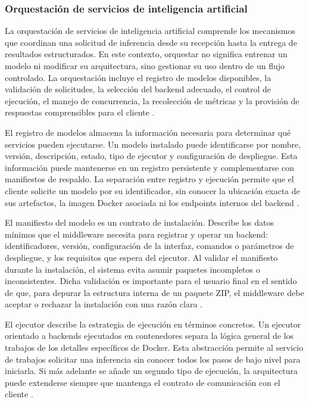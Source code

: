 \documentclass[11pt,a4paper]{article}
\begin{document}
\subsubsection{Orquestación de servicios de inteligencia artificial}

La orquestación de servicios de inteligencia artificial comprende los mecanismos que coordinan una solicitud de inferencia desde su recepción hasta la entrega de resultados estructurados. En este contexto, orquestar no significa entrenar un modelo ni modificar su arquitectura, sino gestionar su uso dentro de un flujo controlado. La orquestación incluye el registro de modelos disponibles, la validación de solicitudes, la selección del backend adecuado, el control de ejecución, el manejo de concurrencia, la recolección de métricas y la provisión de respuestas comprensibles para el cliente \cite{dragoni2017microservices}.

El registro de modelos almacena la información necesaria para determinar qué servicios pueden ejecutarse. Un modelo instalado puede identificarse por nombre, versión, descripción, estado, tipo de ejecutor y configuración de despliegue. Esta información puede mantenerse en un registro persistente y complementarse con manifiestos de respaldo. La separación entre registro y ejecución permite que el cliente solicite un modelo por su identificador, sin conocer la ubicación exacta de sus artefactos, la imagen Docker asociada ni los endpoints internos del backend \cite{docker2026overview}.

El manifiesto del modelo es un contrato de instalación. Describe los datos mínimos que el middleware necesita para registrar y operar un backend: identificadores, versión, configuración de la interfaz, comandos o parámetros de despliegue, y los requisitos que espera del ejecutor. Al validar el manifiesto durante la instalación, el sistema evita asumir paquetes incompletos o inconsistentes. Dicha validación es importante para el usuario final en el sentido de que, para depurar la estructura interna de un paquete ZIP, el middleware debe aceptar o rechazar la instalación con una razón clara \cite{pydantic2026models}.

El ejecutor describe la estrategia de ejecución en términos concretos. Un ejecutor orientado a backends ejecutados en contenedores separa la lógica general de los trabajos de los detalles específicos de Docker. Esta abstracción permite al servicio de trabajos solicitar una inferencia sin conocer todos los pasos de bajo nivel para iniciarla. Si más adelante se añade un segundo tipo de ejecución, la arquitectura puede extenderse siempre que mantenga el contrato de comunicación con el cliente \cite{docker_sdk_python}.
\end{document}
